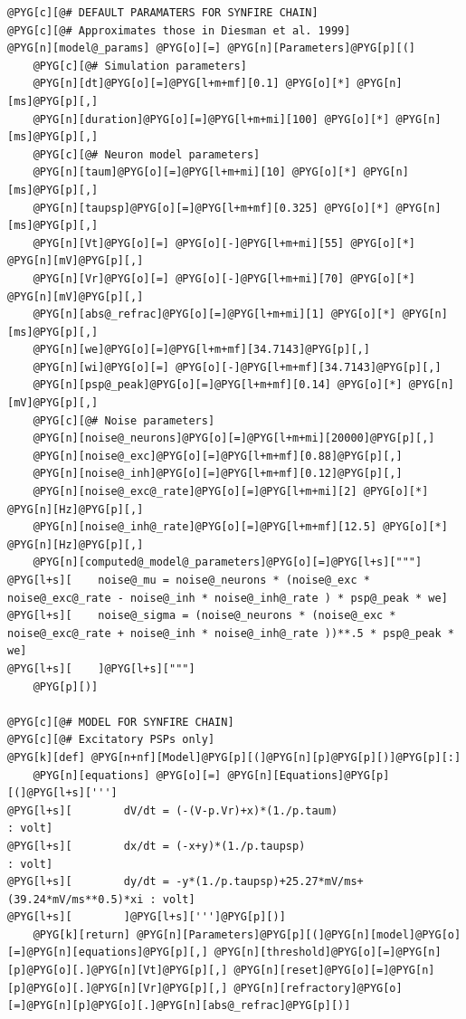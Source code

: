\documentclass[letterpaper,10pt,english]{manual}
\begin{document}
\begin{Verbatim}[commandchars=@\[\]]
@PYG[c][@# DEFAULT PARAMATERS FOR SYNFIRE CHAIN]
@PYG[c][@# Approximates those in Diesman et al. 1999]
@PYG[n][model@_params] @PYG[o][=] @PYG[n][Parameters]@PYG[p][(]
    @PYG[c][@# Simulation parameters]
    @PYG[n][dt]@PYG[o][=]@PYG[l+m+mf][0.1] @PYG[o][*] @PYG[n][ms]@PYG[p][,]
    @PYG[n][duration]@PYG[o][=]@PYG[l+m+mi][100] @PYG[o][*] @PYG[n][ms]@PYG[p][,]
    @PYG[c][@# Neuron model parameters]
    @PYG[n][taum]@PYG[o][=]@PYG[l+m+mi][10] @PYG[o][*] @PYG[n][ms]@PYG[p][,]
    @PYG[n][taupsp]@PYG[o][=]@PYG[l+m+mf][0.325] @PYG[o][*] @PYG[n][ms]@PYG[p][,]
    @PYG[n][Vt]@PYG[o][=] @PYG[o][-]@PYG[l+m+mi][55] @PYG[o][*] @PYG[n][mV]@PYG[p][,]
    @PYG[n][Vr]@PYG[o][=] @PYG[o][-]@PYG[l+m+mi][70] @PYG[o][*] @PYG[n][mV]@PYG[p][,]
    @PYG[n][abs@_refrac]@PYG[o][=]@PYG[l+m+mi][1] @PYG[o][*] @PYG[n][ms]@PYG[p][,]
    @PYG[n][we]@PYG[o][=]@PYG[l+m+mf][34.7143]@PYG[p][,]
    @PYG[n][wi]@PYG[o][=] @PYG[o][-]@PYG[l+m+mf][34.7143]@PYG[p][,]
    @PYG[n][psp@_peak]@PYG[o][=]@PYG[l+m+mf][0.14] @PYG[o][*] @PYG[n][mV]@PYG[p][,]
    @PYG[c][@# Noise parameters]
    @PYG[n][noise@_neurons]@PYG[o][=]@PYG[l+m+mi][20000]@PYG[p][,]
    @PYG[n][noise@_exc]@PYG[o][=]@PYG[l+m+mf][0.88]@PYG[p][,]
    @PYG[n][noise@_inh]@PYG[o][=]@PYG[l+m+mf][0.12]@PYG[p][,]
    @PYG[n][noise@_exc@_rate]@PYG[o][=]@PYG[l+m+mi][2] @PYG[o][*] @PYG[n][Hz]@PYG[p][,]
    @PYG[n][noise@_inh@_rate]@PYG[o][=]@PYG[l+m+mf][12.5] @PYG[o][*] @PYG[n][Hz]@PYG[p][,]
    @PYG[n][computed@_model@_parameters]@PYG[o][=]@PYG[l+s]["""]
@PYG[l+s][    noise@_mu = noise@_neurons * (noise@_exc * noise@_exc@_rate - noise@_inh * noise@_inh@_rate ) * psp@_peak * we]
@PYG[l+s][    noise@_sigma = (noise@_neurons * (noise@_exc * noise@_exc@_rate + noise@_inh * noise@_inh@_rate ))**.5 * psp@_peak * we]
@PYG[l+s][    ]@PYG[l+s]["""]
    @PYG[p][)]

@PYG[c][@# MODEL FOR SYNFIRE CHAIN]
@PYG[c][@# Excitatory PSPs only]
@PYG[k][def] @PYG[n+nf][Model]@PYG[p][(]@PYG[n][p]@PYG[p][)]@PYG[p][:]
    @PYG[n][equations] @PYG[o][=] @PYG[n][Equations]@PYG[p][(]@PYG[l+s][''']
@PYG[l+s][        dV/dt = (-(V-p.Vr)+x)*(1./p.taum)                          : volt]
@PYG[l+s][        dx/dt = (-x+y)*(1./p.taupsp)                               : volt]
@PYG[l+s][        dy/dt = -y*(1./p.taupsp)+25.27*mV/ms+(39.24*mV/ms**0.5)*xi : volt]
@PYG[l+s][        ]@PYG[l+s][''']@PYG[p][)]
    @PYG[k][return] @PYG[n][Parameters]@PYG[p][(]@PYG[n][model]@PYG[o][=]@PYG[n][equations]@PYG[p][,] @PYG[n][threshold]@PYG[o][=]@PYG[n][p]@PYG[o][.]@PYG[n][Vt]@PYG[p][,] @PYG[n][reset]@PYG[o][=]@PYG[n][p]@PYG[o][.]@PYG[n][Vr]@PYG[p][,] @PYG[n][refractory]@PYG[o][=]@PYG[n][p]@PYG[o][.]@PYG[n][abs@_refrac]@PYG[p][)]


\end{Verbatim}
\end{document}
